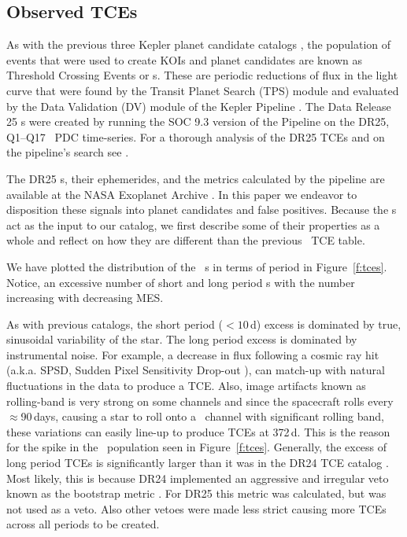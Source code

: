 \subsection{Observed TCEs}

\label{s:tces}
As with the previous three Kepler planet candidate catalogs \citep{Coughlin2016,Mullally2015cat,Rowe2015cat}, the population of events that were used to create KOIs and planet candidates are known as Threshold Crossing Events or \opstce s.  These are periodic reductions of flux in the light curve that were found by the Transit Planet Search (TPS) module and evaluated by the Data Validation (DV) module of the Kepler Pipeline \citep{JenkinsKDPH}.   The Data Release 25 \opstce s were created by running the SOC 9.3 version of the Pipeline on the DR25, Q1--Q17 \Kepler\ PDC time-series.  For a thorough analysis of the DR25 TCEs and on the pipeline's search see \citet{Twicken2016}.  

The DR25 \opstce s, their ephemerides, and the metrics calculated by the pipeline are available at the NASA Exoplanet Archive \citep{Akeson2013}.  In this paper we endeavor to disposition these signals into planet candidates and false positives.  Because the \opstce s act as the input to our catalog, we first describe some of their properties as a whole and reflect on how they are different than the previous \Kepler\ TCE table.

We have plotted the distribution of the \ntcesnorogue\ \opstce s in terms of period in Figure~\ref{f:tces}. Notice, an excessive number of short and long period \opstce s with the number increasing with decreasing MES. 

As with previous catalogs, the short period ($<10$\,d) excess is dominated by true, sinusoidal variability of the star. The long period excess is dominated by instrumental noise. For example, a decrease in flux following a cosmic ray hit (a.k.a. SPSD, Sudden Pixel Sensitivity Drop-out ), can match-up with natural fluctuations in the data to produce a TCE. Also, image artifacts known as rolling-band is very strong on some channels \citep[see \S6.7 of][]{KIH}  and since the spacecraft rolls every $\approx$90\,days, causing a star to roll onto a \Kepler\ channel with significant rolling band, these variations can easily line-up to produce TCEs at 372\,d. This is the reason for the spike in the \opstce\ population seen in Figure~\ref{f:tces}. Generally, the excess of long period TCEs is significantly larger than it was in the DR24 TCE catalog \citep{Seader2015}. Most likely, this is because DR24 implemented an aggressive and irregular veto known as the bootstrap metric \citep{JenkinsBootstrap}.  For DR25 this metric was calculated, but was not used as a veto. Also other vetoes were made less strict causing more TCEs across all periods to be created. 


